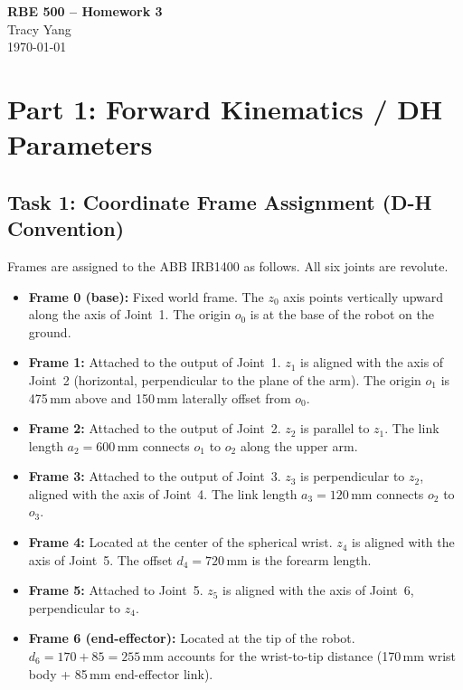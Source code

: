 \documentclass[12pt]{article}
\begin{document}
\begin{center}
    {\LARGE \textbf{RBE 500 -- Homework 3}} \\[6pt]
    {\large Tracy Yang} \\[4pt]
    {\large \today}
\end{center}

\section{Part 1: Forward Kinematics / DH Parameters}

\subsection{Task 1: Coordinate Frame Assignment (D-H Convention)}

Frames are assigned to the ABB IRB1400 as follows. All six joints are revolute.
\begin{itemize}
    \item \textbf{Frame 0 (base):} Fixed world frame. The $z_0$ axis
    points vertically upward along the axis of Joint~1. The origin $o_0$
    is at the base of the robot on the ground.

    \item \textbf{Frame 1:} Attached to the output of Joint~1.
    $z_1$ is aligned with the axis of Joint~2 (horizontal, perpendicular
    to the plane of the arm). The origin $o_1$ is 475\,mm above and
    150\,mm laterally offset from $o_0$.

    \item \textbf{Frame 2:} Attached to the output of Joint~2.
    $z_2$ is parallel to $z_1$. The link length $a_2 = 600$\,mm
    connects $o_1$ to $o_2$ along the upper arm.

    \item \textbf{Frame 3:} Attached to the output of Joint~3.
    $z_3$ is perpendicular to $z_2$, aligned with the axis of Joint~4.
    The link length $a_3 = 120$\,mm connects $o_2$ to $o_3$.

    \item \textbf{Frame 4:} Located at the center of the spherical
    wrist. $z_4$ is aligned with the axis of Joint~5.
    The offset $d_4 = 720$\,mm is the forearm length.

    \item \textbf{Frame 5:} Attached to Joint~5. $z_5$ is aligned
    with the axis of Joint~6, perpendicular to $z_4$.

    \item \textbf{Frame 6 (end-effector):} Located at the tip of the
    robot. $d_6 = 170 + 85 = 255$\,mm accounts for the wrist-to-tip
    distance (170\,mm wrist body + 85\,mm end-effector link).
\end{itemize}
\end{document}

